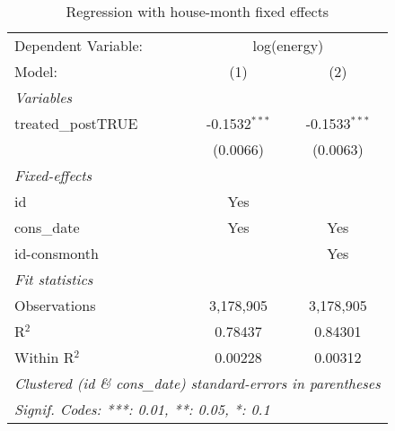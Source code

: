 
\begin{table}[htbp]
   \centering
   \caption{Regression with house-month fixed effects\label{tab:hm}}
   \begin{tabular}{lcc}
      \tabularnewline\midrule\midrule
      Dependent Variable: & \multicolumn{2}{c}{log(energy)}\\
      Model:             & (1)             & (2)\\
      \midrule \emph{Variables} &   &  \\
      treated\_postTRUE & -0.1532$^{***}$ & -0.1533$^{***}$\\
                         & (0.0066)        & (0.0063)\\
      \midrule \emph{Fixed-effects} &   &  \\
      id                 & Yes             & \\
      cons\_date        & Yes             & Yes\\
      id-consmonth       &                 & Yes\\
      \midrule \emph{Fit statistics} &   &  \\
      Observations       & 3,178,905       & 3,178,905\\
      R$^2$              & 0.78437         & 0.84301\\
      Within R$^2$       & 0.00228         & 0.00312\\
      \midrule\midrule\multicolumn{3}{l}{\emph{Clustered (id \& cons\_date) standard-errors in parentheses}}\\
      \multicolumn{3}{l}{\emph{Signif. Codes: ***: 0.01, **: 0.05, *: 0.1}}\\
   \end{tabular}
\end{table}


